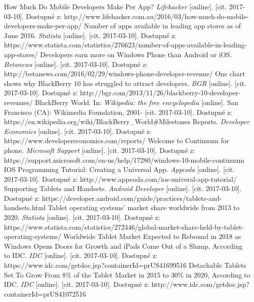 \documentclass[english,master,public,dept460,male,cpdeclaration,oneside]{diploma}
\begin{document}
\begin{thebibliography}{99}
	 How Much Do Mobile Developers Make Per App? \textit{Lifehacker} [online]. [cit. 2017-03-10]. Dostupné z: http://www.lifehacker.com.au/2016/03/how-much-do-mobile-developers-make-per-app/
	 Number of apps available in leading app stores as of June 2016. \textit{Statista} [online]. [cit. 2017-03-10]. Dostupné z: https://www.statista.com/statistics/276623/number-of-apps-available-in-leading-app-stores/
	 Developers earn more on Windows Phone than Android or iOS. \textit{Betanews} [online]. [cit. 2017-03-10]. Dostupné z: http://betanews.com/2016/02/29/windows-phone-developer-revenue/
	 One chart shows why BlackBerry 10 has struggled to attract developers. \textit{BGR} [online]. [cit. 2017-03-10]. Dostupné z: http://bgr.com/2013/11/26/blackberry-10-developer-revenues/
	 BlackBerry World. In: \textit{Wikipedia: the free encyclopedia} [online]. San Francisco (CA): Wikimedia Foundation, 2001- [cit. 2017-03-10]. Dostupné z: https://en.wikipedia.org/wiki/BlackBerry\_World\#Milestones
	 Reports. \textit{Developer Economics} [online]. [cit. 2017-03-10]. Dostupné z: https://www.developereconomics.com/reports/
	 Welcome to Continuum for phone. \textit{Microsoft Support} [online]. [cit. 2017-03-10]. Dostupné z: https://support.microsoft.com/en-us/help/17280/windows-10-mobile-continuum
	 IOS Programming Tutorial: Creating a Universal App. \textit{Appcoda} [online]. [cit. 2017-03-10]. Dostupné z: http://www.appcoda.com/ios-univeral-app-tutorial/
	 Supporting Tablets and Handsets. \textit{Android Developer} [online]. [cit. 2017-03-10]. Dostupné z: https://developer.android.com/guide/practices/tablets-and-handsets.html
	 Tablet operating systems' market share worldwide from 2013 to 2020. \textit{Statista} [online]. [cit. 2017-03-10]. Dostupné z: https://www.statista.com/statistics/272446/global-market-share-held-by-tablet-operating-systems/
	 Worldwide Tablet Market Expected to Rebound in 2018 as Windows Opens Doors for Growth and iPads Come Out of a Slump, According to IDC. \textit{IDC} [online]. [cit. 2017-03-10]. Dostupné z: https://www.idc.com/getdoc.jsp?containerId=prUS41699516
	 Detachable Tablets Set To Grow From 8\% of the Tablet Market in 2015 to 30\% in 2020, According to IDC. \textit{IDC} [online]. [cit. 2017-03-10]. Dostupné z: http://www.idc.com/getdoc.jsp?containerId=prUS41072516

\end{thebibliography}
\end{document}
